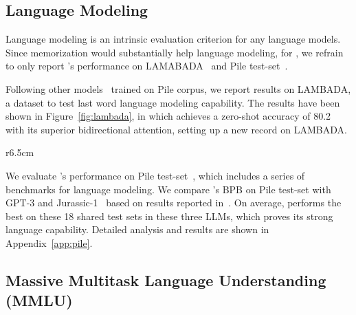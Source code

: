 {\subsection{Language Modeling}
Language modeling is an intrinsic evaluation criterion for any language models.
Since memorization would substantially help language modeling, for \glm, we refrain to only report \glm's performance on LAMABADA~\citep{paperno2016lambada} and Pile test-set~\citep{gao2020pile}.

Following other models~\citep{black2022gpt,gpt-j} trained on Pile corpus, we report results on LAMBADA, a dataset to test last word language modeling capability.
The results have been shown in Figure~\ref{fig:lambada}, in which \glm achieves a zero-shot accuracy of 80.2 with its superior bidirectional attention, setting up a new record on LAMBADA.

\begin{wraptable}{r}{6.5cm}
	\centering
	\footnotesize
	\vspace{-4mm}
    \renewcommand\tabcolsep{2pt}
	\caption{\glm and its similar-sized LLMs' average BPB on Pile (18 sub-datasets).}
	\vspace{-2mm}
    \vspace{-2mm}
\end{wraptable}

We evaluate \glm's performance on Pile test-set~\citep{gao2020pile}, which includes a series of benchmarks for language modeling.
We compare \glm's BPB on Pile test-set with GPT-3 and Jurassic-1~\citep{lieber2021jurassic} based on results reported in~\citep{lieber2021jurassic}.
On average, \glm performs the best on these 18 shared test sets in these three LLMs, which proves its strong language capability. Detailed analysis and results are shown in Appendix~\ref{app:pile}.

\subsection{Massive Multitask Language Understanding (MMLU)} \label{sec:mmlu}

}
